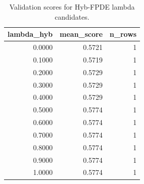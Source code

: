 \begin{table}[t]
\caption{Validation scores for Hyb-FPDE lambda candidates.}
\label{tab:lambda_distribution_computed}
\centering
\begin{tabular}{rrr}
\toprule
lambda\_hyb & mean\_score & n\_rows \\
\midrule
0.0000 & 0.5721 & 1 \\
0.1000 & 0.5719 & 1 \\
0.2000 & 0.5729 & 1 \\
0.3000 & 0.5729 & 1 \\
0.4000 & 0.5729 & 1 \\
0.5000 & 0.5774 & 1 \\
0.6000 & 0.5774 & 1 \\
0.7000 & 0.5774 & 1 \\
0.8000 & 0.5774 & 1 \\
0.9000 & 0.5774 & 1 \\
1.0000 & 0.5774 & 1 \\
\bottomrule
\end{tabular}

\end{table}
